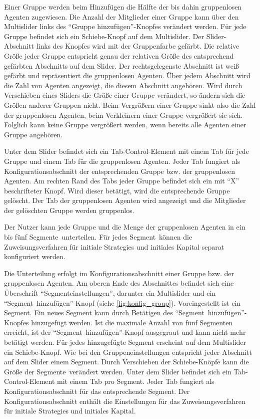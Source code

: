 \documentclass[parskip=full,11pt]{scrartcl}
\def\segment{Segment}
\def\segments{Segmente}
\begin{document}
Einer Gruppe werden beim Hinzufügen die Hälfte der bis dahin gruppenlosen Agenten zugewiesen. Die Anzahl der Mitglieder einer Gruppe kann über den \Gls{Multislider} links des \enquote{Gruppe hinzufügen}-Knopfes verändert werden. Für jede Gruppe befindet sich ein Schiebe-Knopf auf dem \Gls{Multislider}. Der \Gls{Slider-Abschnitt} links des Knopfes wird mit der Gruppenfarbe gefärbt. Die relative Größe jeder Gruppe entspricht genau der relativen Größe des entsprechend gefärbten Abschnitts auf dem Slider. Der rechtsgelegenste Abschnitt ist weiß gefärbt und repräsentiert die gruppenlosen Agenten. Über jedem Abschnitt wird die Zahl von Agenten angezeigt, die diesem Abschnitt angehören. Wird durch Verschieben eines Sliders die Größe einer Gruppe verändert, so ändern sich die Größen anderer Gruppen nicht. Beim Vergrößern einer Gruppe sinkt also die Zahl der gruppenlosen Agenten, beim Verkleinern einer Gruppe vergrößert sie sich. Folglich kann keine Gruppe vergrößert werden, wenn bereits alle Agenten einer Gruppe angehören.

Unter dem Slider befindet sich ein Tab-Control-Element mit einem Tab für jede Gruppe und einem Tab für die gruppenlosen Agenten. Jeder Tab fungiert als Konfigurationsabschnitt der entsprechenden Gruppe bzw. der gruppenlosen Agenten. Am rechten Rand des Tabs jeder Gruppe befindet sich ein mit \enquote{X} beschrifteter Knopf. Wird dieser betätigt, wird die entsprechende Gruppe gelöscht. Der Tab der gruppenlosen Agenten wird angezeigt und die Mitglieder der gelöschten Gruppe werden gruppenlos.

\functionality{Einteilung von Gruppen in \segments}{fnc:segments}
Der \Gls{Nutzer} kann jede Gruppe und die Menge der gruppenlosen Agenten in ein bis fünf \segments\ unterteilen. Für jedes \segment\ können die Zuweisungsverfahren für initiale \Glspl{Strategie} und initiales \Gls{Kapital} separat konfiguriert werden.

Die Unterteilung erfolgt im Konfigurationsabschnitt einer Gruppe bzw. der gruppenlosen Agenten. Am oberen Ende des Abschnittes befindet sich eine Überschrift \enquote{\segment einstellungen}, darunter ein \Gls{Multislider} und ein \enquote{\segment\ hinzufügen}-Knopf (siehe \cref{fig:konfig_group}). Voreingestellt ist ein Segment. Ein neues Segment kann durch Betätigen des \enquote{\segment\ hinzufügen}-Knopfes hinzugefügt werden. Ist die maximale Anzahl von fünf \segments n erreicht, ist der \enquote{\segment\ hinzufügen}-Knopf ausgegraut und kann nicht mehr betätigt werden. Für jedes hinzugefügte Segment erscheint auf dem \Gls{Multislider} ein Schiebe-Knopf. Wie bei den Gruppeneinstellungen entspricht jeder Abschnitt auf dem Slider einem \segment. Durch Verschieben der Schiebe-Knöpfe kann die Größe der \segments\ verändert werden. Unter dem Slider befindet sich ein Tab-Control-Element mit einem Tab pro \segment. Jeder Tab fungiert als Konfigurationsabschnitt für das entsprechende \segment. Der Konfigurationsabschnitt enthält die Einstellungen für das Zuweisungsverfahren für initiale \Glspl{Strategie} und initiales \Gls{Kapital}.
\end{document}
